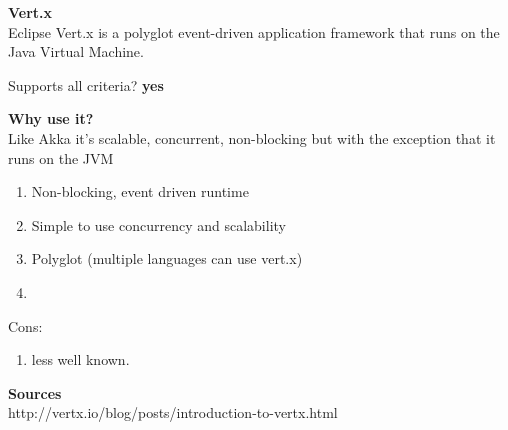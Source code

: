 
\textbf{Vert.x} \\
Eclipse Vert.x is a polyglot event-driven application framework that runs on the Java Virtual Machine.

Supports all criteria?
\textbf{yes}

\textbf{Why use it?} \\
 Like Akka it’s scalable, concurrent, non-blocking but with the exception that it runs on the JVM\\

\begin{enumerate}
	\item Non-blocking, event driven runtime
	\item Simple to use concurrency and scalability
	\item Polyglot (multiple languages can use vert.x)
	\item 
\end{enumerate}
Cons:
\begin{enumerate}
	\item less well known.
\end{enumerate}

\textbf{Sources}\\
http://vertx.io/blog/posts/introduction-to-vertx.html